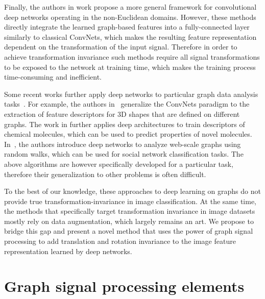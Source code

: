\documentclass[10pt,journal,compsoc]{IEEEtran}
\newcommand{\renata}[1]{\textcolor{black}{#1}}
\begin{document}
	Finally, the authors in work \cite{bb:MontiBMRSB17} propose a more general framework for convolutional deep networks operating in the non-Euclidean domains. However, these methods directly integrate the learned graph-based features into a fully-connected layer similarly to classical ConvNets, which makes the resulting feature representation dependent on the transformation of the input signal. Therefore in order to achieve transformation invariance such methods require all signal transformations to be exposed to the network at training time, which makes the training process time-consuming and inefficient.
	
	Some recent works further apply deep networks to particular graph data analysis tasks~\cite{bb:bronstein2017geometric}. For example, the authors in~\cite{bb:bronsteingeodesicconv} generalize the ConvNets paradigm to the extraction of feature descriptors for 3D shapes that are defined on different graphs. The work in \cite{bb:nips_fingerprint} further applies deep architectures to train descriptors of chemical molecules, which can be used to predict properties of novel molecules. In~\cite{bb:deepwalk}, the  authors introduce deep networks to analyze web-scale graphs using random walks, which can be used for social network classification tasks. The above algorithms are however specifically developed for a particular task, therefore their generalization to other problems is often difficult.
	
	To the best of our knowledge, these approaches to deep learning on graphs do not provide true transformation-invariance in image classification. At the same time, the methods that specifically target transformation invariance in image datasets mostly rely on data augmentation, which largely remains an art. We propose to bridge this gap and present a novel method that uses the power of graph signal processing to add translation and rotation invariance to the image feature representation learned by deep networks.
	
	
	
	
	
	\section{Graph signal processing elements}
	\label{s:gsp}
	
\end{document}
